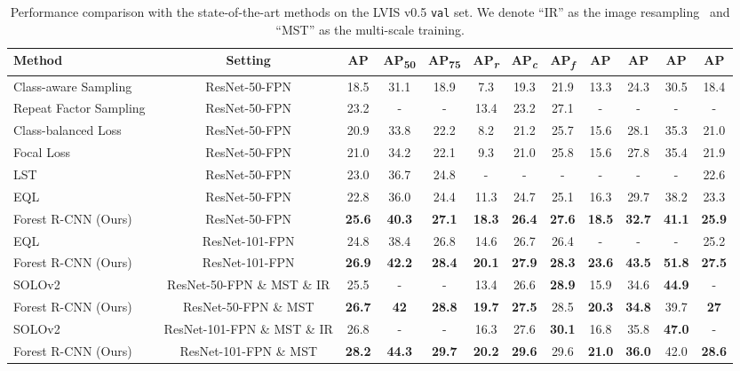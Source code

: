 \documentclass[sigconf]{acmart}
\begin{document}
\begin{table*}
	\centering
	\caption{Performance comparison with the state-of-the-art methods on the LVIS v0.5 \texttt{val} set. We denote ``IR'' as the image resampling~\cite{lvis} and ``MST'' as the multi-scale training. }
	\vspace{-4mm}
	\label{tab:comparison_sota}
	\begin{tabular}{l|c|c c c|c c c|ccc|c}
	Method& Setting  & AP & AP\textsubscript{50} & AP\textsubscript{75}& AP\textsubscript{\textit{r}} & AP\textsubscript{\textit{c}} & AP\textsubscript{\textit{f}}& AP& AP& AP& AP\\
	\toprule[1.3pt]
	
	Class-aware Sampling~\cite{cls_sample} & ResNet-50-FPN &  18.5 & 31.1 & 18.9 & 7.3 & 19.3 & 21.9&13.3&24.3&30.5 & 18.4  \\
	Repeat Factor Sampling~\cite{lvis} &ResNet-50-FPN &  23.2 &-&-& 13.4 & 23.2 & 27.1&-&-&-&- \\
	Class-balanced Loss~\cite{cls_balance_loss} & ResNet-50-FPN & 20.9 & 33.8 & 22.2 & 8.2 & 21.2 & 25.7&15.6&28.1&35.3 & 21.0  \\
	Focal Loss~\cite{focal_loss}& ResNet-50-FPN & 21.0 & 34.2 & 22.1 & 9.3 & 21.0 & 25.8 &15.6&27.8&35.4& 21.9  \\
	LST\cite{lst}& ResNet-50-FPN & 23.0 & 36.7 & 24.8 & - & - & -&-&-&- & 22.6  \\
	EQL~\cite{equalization_loss}&ResNet-50-FPN & 22.8 & 36.0 & 24.4 & 11.3 & 24.7 & 25.1 &16.3&29.7&38.2& 23.3  \\
	Forest R-CNN (Ours)&ResNet-50-FPN&\bf 25.6 &\bf 40.3 &\bf 27.1 &\bf 18.3 &\bf 26.4 &\bf 27.6& \bf18.5& \bf 32.7& \bf 41.1 &\bf 25.9  \\
	
	\hline	
	EQL~\cite{equalization_loss}& ResNet-101-FPN& 24.8 & 38.4 & 26.8 & 14.6 & 26.7 &26.4&-&-&- & 25.2 \\
	Forest R-CNN (Ours)&ResNet-101-FPN& \bf 26.9 &\bf 42.2  &\bf 28.4 &\bf 20.1&\bf 27.9 &\bf 28.3 &\bf 23.6&\bf 43.5&\bf 51.8&\bf 27.5  \\
	
	\hline	
	SOLOv2~\cite{solov2}& ResNet-50-FPN \& MST \& IR& 25.5 & - & - & 13.4 & 26.6 &\bf 28.9&15.9&34.6&\bf 44.9 & - \\
	Forest R-CNN (Ours)&ResNet-50-FPN \& MST& \bf 26.7 &\bf 42  &\bf 28.8 &\bf 19.7&\bf 27.5 & 28.5 &\bf20.3&\bf34.8&39.7&\bf 27  \\
	
	\hline
	SOLOv2~\cite{solov2}&ResNet-101-FPN \& MST \& IR& 26.8 & - & - & 16.3 & 27.6 &\bf 30.1&16.8&35.8&\bf 47.0 & -  \\
	Forest R-CNN (Ours)&ResNet-101-FPN \& MST&\bf 28.2  &\bf 44.3 &\bf 29.7&\bf 20.2  &\bf 29.6  & 29.6&\bf 21.0&\bf 36.0 & 42.0&\bf 28.6  \\
	
	\end{tabular}
\vspace{-4mm}
\end{table*}
\end{document}
